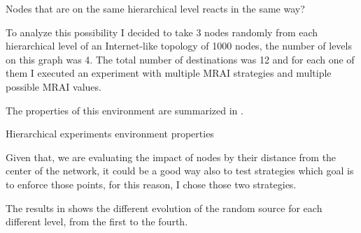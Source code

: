 Nodes that are on the same hierarchical level reacts in the same way?

To analyze this possibility I decided to take \num{3} nodes randomly from each
hierarchical level of an Internet-like topology of \num{1000} nodes, the number
of levels on this graph was \num{4}.
The total number of destinations was \num{12} and for each one of them I executed
an experiment with multiple \ac{MRAI} strategies and multiple possible \ac{MRAI}
values.

The properties of this environment are summarized in .

\begin{table}[h]
	
	\caption{Hierarchical experiments environment properties}
	\label{tbl:hierarchical_properties}
\end{table}

Given that, we are evaluating the impact of nodes by their distance from
the center of the network, it could be a good way also to test strategies
which goal is to enforce those points, for this reason, I chose those two
strategies.

The results in  shows the different evolution of
the random source for each different level, from the first to the fourth.

